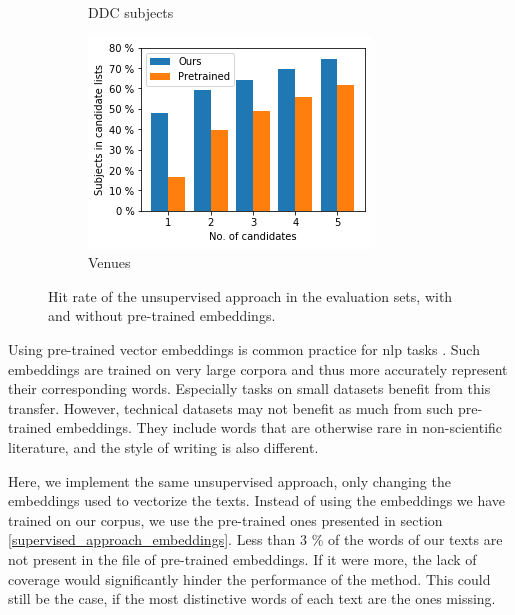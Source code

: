 \begin{figure}
\begin{subfigure}[t]{.32\textwidth}
    \caption{DDC subjects}
    \label{fig:pretrained_ddc}
  \end{subfigure}
   \begin{subfigure}[t]{.32\textwidth}
    \centering
    \includegraphics[width=\textwidth]{figures/unsupervised_approach/results/pretrained_venue.png}
    \caption{Venues}
    \label{fig:pretrained_venue}
  \end{subfigure}
  \caption{Hit rate of the unsupervised approach in the evaluation sets, with and without pre-trained embeddings.}
  \label{fig:pretrained_eval}
\end{figure}

Using pre-trained vector embeddings is common practice for \acrfull{nlp} tasks \cite{mikolov2017advances}. Such embeddings are trained on very large corpora and thus more accurately represent their corresponding words. Especially tasks on small datasets benefit from this transfer. However, technical datasets may not benefit as much from such pre-trained embeddings. They include words that are otherwise rare in non-scientific literature, and the style of writing is also different.

Here, we implement the same unsupervised approach, only changing the embeddings used to vectorize the texts. Instead of using the embeddings we have trained on our corpus, we use the pre-trained ones presented in section \ref{supervised_approach_embeddings}. Less than 3 \% of the words of our texts are not present in the file of pre-trained embeddings. If it were more, the lack of coverage would significantly hinder the performance of the method. This could still be the case, if the most distinctive words of each text are the ones missing.

